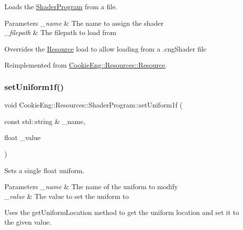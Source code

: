 Loads the \hyperlink{class_cookie_eng_1_1_resources_1_1_shader_program}{Shader\+Program} from a file. 


\begin{DoxyParams}{Parameters}
{\em \+\_\+name} & The name to assign the shader \\
\hline
{\em \+\_\+filepath} & The filepath to load from\\
\hline
\end{DoxyParams}
Overrides the \hyperlink{class_cookie_eng_1_1_resources_1_1_resource}{Resource} load to allow loading from a .cng\+Shader file 

Reimplemented from \hyperlink{class_cookie_eng_1_1_resources_1_1_resource_a75648b8f2e442bebc90d6eb4ea3a2f6e}{Cookie\+Eng\+::\+Resources\+::\+Resource}.

\mbox{\label{class_cookie_eng_1_1_resources_1_1_shader_program_a6029828eaecc40f6a68779b86f5baf6d}} 
\subsubsection{\texorpdfstring{set\+Uniform1f()}{setUniform1f()}}
{\footnotesize\ttfamily void Cookie\+Eng\+::\+Resources\+::\+Shader\+Program\+::set\+Uniform1f (\begin{DoxyParamCaption}\item[{const std\+::string \&}]{\+\_\+name,  }\item[{float}]{\+\_\+value }\end{DoxyParamCaption})}



Sets a single float uniform. 


\begin{DoxyParams}{Parameters}
{\em \+\_\+name} & The name of the uniform to modify \\
\hline
{\em \+\_\+value} & The value to set the uniform to\\
\hline
\end{DoxyParams}
Uses the get\+Uniform\+Location method to get the uniform location and set it to the given value. \mbox{\label{class_cookie_eng_1_1_resources_1_1_shader_program_a328b09fef2d715e25f9dc3993b060b99}} 
